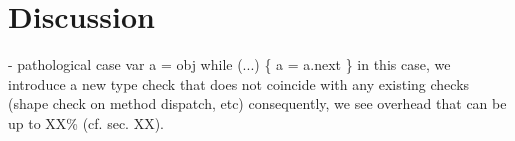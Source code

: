 
\section{Discussion}
\label{sec:discussion}


\begin{cnote}
- pathological case
  var a = obj
  while (...) \{
    a = a.next
  \}
  in this case, we introduce a new type check that does not coincide with any
  existing checks (shape check on method dispatch, etc)
  consequently, we see overhead that can be up to XX\% (cf. sec. XX).
\end{cnote}

